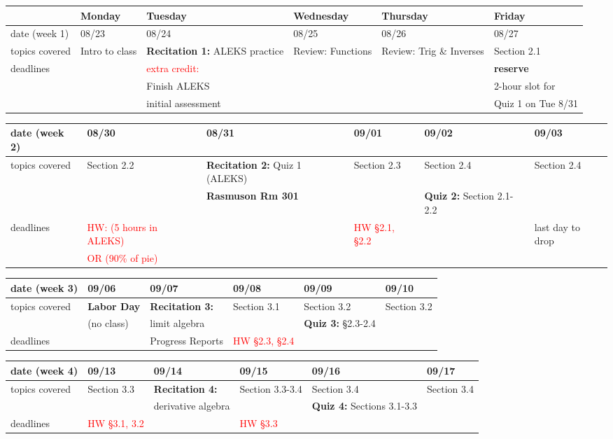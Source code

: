 \documentclass[11pt,fleqn]{article}
\begin{document}
\begin{tabularx}{\textwidth}{|X|| X | X | X | X | X |}
\hline
&Monday & Tuesday & Wednesday & Thursday & Friday \\
\hline \hline
\rowcolor{gray!20} 
date (week 1)&08/23&08/24&08/25&08/26&08/27\\
\hline
topics covered&Intro to class& \textbf{Recitation 1:} ALEKS practice&  Review: Functions & Review:  Trig \& Inverses&Section 2.1\\
\hline
deadlines&&\textcolor{red}{extra credit:} &&&\textbf{reserve}\\
&&Finish ALEKS&&&2-hour slot for\\
&& initial assessment &&& Quiz 1 on Tue 8/31\\
\hline 
\end{tabularx}
\vfill
\begin{tabularx}{\textwidth}{|X|| X | X | X | X | X |}
\hline
\rowcolor{gray!20}
date (week 2)&08/30&08/31&09/01&09/02&09/03\\ \hline
topics covered &Section 2.2&\textbf{Recitation 2:} Quiz 1 (ALEKS)& Section 2.3 &Section 2.4&Section 2.4\\ 
&&\textbf{\textcolor{ddgreen}{Rasmuson Rm 301}}&&\textbf{Quiz 2:} Section 2.1-2.2&\\ \hline
deadlines&\textcolor{red}{HW: (5 hours in ALEKS)}&&\textcolor{red}{HW \S 2.1, \S 2.2}&&\textcolor{ddgreen}{last day to drop}\\ 
& \textcolor{red}{ OR (90\% of pie)}&&&& \\
 \hline 
 \end{tabularx}
 \vfill
\begin{tabularx}{\textwidth}{|X|| X | X | X | X | X |}
\hline
\rowcolor{gray!20}
date (week 3)&09/06&09/07&09/08&09/09&09/10\\ \hline
topics covered&\textbf{Labor Day}&\textbf{Recitation 3:} &Section 3.1 &Section 3.2&Section 3.2\\
&(no class)&limit algebra&&\textbf{Quiz 3:} \S 2.3-2.4&\\ \hline
deadlines& & \textcolor{ddgreen}{Progress Reports}&\textcolor{red}{HW \S 2.3, \S 2.4}&& \\ \hline
\end{tabularx}
\vfill
\begin{tabularx}{\textwidth}{|X|| X | X | X | X | X |}
\hline
\rowcolor{gray!20}
date (week 4)&09/13&09/14&09/15&09/16&09/17\\ \hline
topics covered&Section 3.3&\textbf{Recitation 4:}&Section 3.3-3.4&Section 3.4&Section 3.4\\ 
&&derivative algebra&&\textbf{Quiz 4:} Sections 3.1-3.3& \\ \hline
deadlines&\textcolor{red}{HW \S 3.1, 3.2}& &\textcolor{red}{HW \S 3.3}&& \\ \hline 
\end{tabularx}
\end{document}
